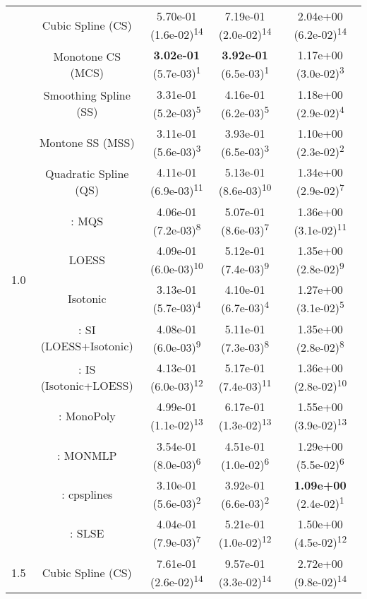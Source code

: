\begin{tabular}{ccccc}
\midrule
\multirow{14}{*}{1.0}&Cubic Spline (CS)& 5.70e-01 (1.6e-02)\textsuperscript{14}& 7.19e-01 (2.0e-02)\textsuperscript{14}& 2.04e+00 (6.2e-02)\textsuperscript{14}\tabularnewline
&Monotone CS (MCS)& \textbf{3.02e-01} (5.7e-03)\textsuperscript{1}& \textbf{3.92e-01} (6.5e-03)\textsuperscript{1}& 1.17e+00 (3.0e-02)\textsuperscript{3}\tabularnewline
&Smoothing Spline (SS)& 3.31e-01 (5.2e-03)\textsuperscript{5}& 4.16e-01 (6.2e-03)\textsuperscript{5}& 1.18e+00 (2.9e-02)\textsuperscript{4}\tabularnewline
&Montone SS (MSS)& 3.11e-01 (5.6e-03)\textsuperscript{3}& 3.93e-01 (6.5e-03)\textsuperscript{3}& 1.10e+00 (2.3e-02)\textsuperscript{2}\tabularnewline
&Quadratic Spline (QS)& 4.11e-01 (6.9e-03)\textsuperscript{11}& 5.13e-01 (8.6e-03)\textsuperscript{10}& 1.34e+00 (2.9e-02)\textsuperscript{7}\tabularnewline
&\textcite{heMonotoneBsplineSmoothing1998}: MQS& 4.06e-01 (7.2e-03)\textsuperscript{8}& 5.07e-01 (8.6e-03)\textsuperscript{7}& 1.36e+00 (3.1e-02)\textsuperscript{11}\tabularnewline
&LOESS& 4.09e-01 (6.0e-03)\textsuperscript{10}& 5.12e-01 (7.4e-03)\textsuperscript{9}& 1.35e+00 (2.8e-02)\textsuperscript{9}\tabularnewline
&Isotonic& 3.13e-01 (5.7e-03)\textsuperscript{4}& 4.10e-01 (6.7e-03)\textsuperscript{4}& 1.27e+00 (3.1e-02)\textsuperscript{5}\tabularnewline
&\textcite{mammenEstimatingSmoothMonotone1991}: SI (LOESS+Isotonic)& 4.08e-01 (6.0e-03)\textsuperscript{9}& 5.11e-01 (7.3e-03)\textsuperscript{8}& 1.35e+00 (2.8e-02)\textsuperscript{8}\tabularnewline
&\textcite{mammenEstimatingSmoothMonotone1991}: IS (Isotonic+LOESS)& 4.13e-01 (6.0e-03)\textsuperscript{12}& 5.17e-01 (7.4e-03)\textsuperscript{11}& 1.36e+00 (2.8e-02)\textsuperscript{10}\tabularnewline
&\textcite{murrayFastFlexibleMethods2016a}: MonoPoly& 4.99e-01 (1.1e-02)\textsuperscript{13}& 6.17e-01 (1.3e-02)\textsuperscript{13}& 1.55e+00 (3.9e-02)\textsuperscript{13}\tabularnewline
&\textcite{cannonMonmlpMultilayerPerceptron2017}: MONMLP& 3.54e-01 (8.0e-03)\textsuperscript{6}& 4.51e-01 (1.0e-02)\textsuperscript{6}& 1.29e+00 (5.5e-02)\textsuperscript{6}\tabularnewline
&\textcite{navarro-garciaConstrainedSmoothingOutofrange2023}: cpsplines& 3.10e-01 (5.6e-03)\textsuperscript{2}& 3.92e-01 (6.6e-03)\textsuperscript{2}& \textbf{1.09e+00} (2.4e-02)\textsuperscript{1}\tabularnewline
&\textcite{groeneboomConfidenceIntervalsMonotone2023}: SLSE& 4.04e-01 (7.9e-03)\textsuperscript{7}& 5.21e-01 (1.0e-02)\textsuperscript{12}& 1.50e+00 (4.5e-02)\textsuperscript{12}\tabularnewline
\midrule
\multirow{14}{*}{1.5}&Cubic Spline (CS)& 7.61e-01 (2.6e-02)\textsuperscript{14}& 9.57e-01 (3.3e-02)\textsuperscript{14}& 2.72e+00 (9.8e-02)\textsuperscript{14}\tabularnewline

\end{tabular}
